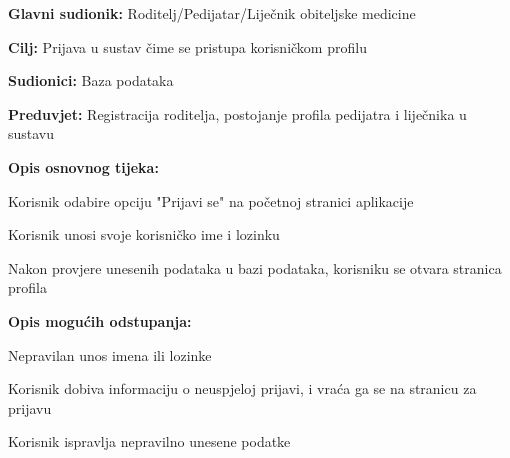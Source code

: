 					\noindent {}
					\begin{packed_item}
						
						\item \textbf{Glavni sudionik: }Roditelj/Pedijatar/Liječnik obiteljske medicine
						\item  \textbf{Cilj:} Prijava u sustav čime se pristupa korisničkom profilu
						\item  \textbf{Sudionici:} Baza podataka
						\item  \textbf{Preduvjet:} Registracija roditelja, postojanje profila pedijatra i liječnika u sustavu
						\item  \textbf{Opis osnovnog tijeka:}
						
						\item[] \begin{packed_enum}
							
							\item Korisnik odabire opciju "Prijavi se" na početnoj stranici aplikacije
							\item Korisnik unosi svoje korisničko ime i lozinku
							\item Nakon provjere unesenih podataka u bazi podataka, korisniku se otvara stranica profila
						\end{packed_enum}
						
						\item  \textbf{Opis mogućih odstupanja:}
						
						\item[] \begin{packed_item}
							
							\item[2.a] Nepravilan unos imena ili lozinke
							\item[] \begin{packed_enum}
								
								\item Korisnik dobiva informaciju o neuspjeloj prijavi, i vraća ga se na stranicu za prijavu
								\item Korisnik ispravlja nepravilno unesene podatke
								
							\end{packed_enum}	
						\end{packed_item}
					\end{packed_item}
					
